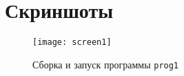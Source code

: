 \section{Скриншоты}

\begin{figure}[H]
  \centering
  \texttt{[image: screen1]}
  \caption{Сборка и запуск программы \texttt{prog1}}
\end{figure}
